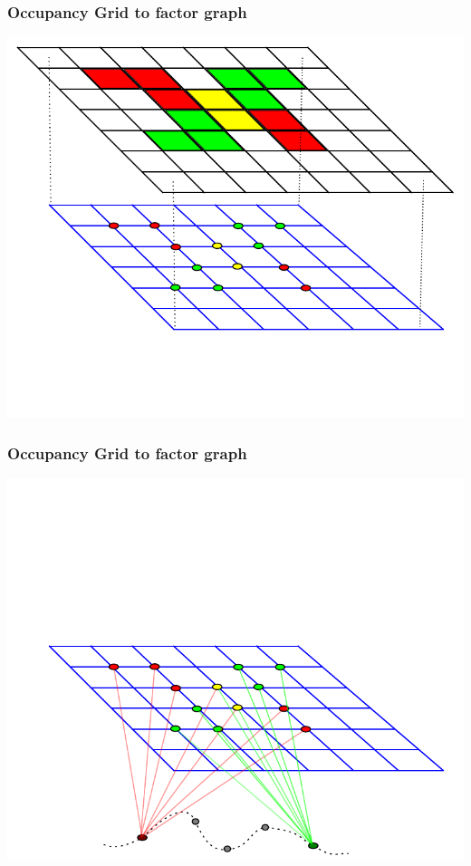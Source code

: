 \documentclass{beamer}
\begin{document}
\begin{frame}
\frametitle{Occupancy Grid to factor graph}
\includegraphics[width=\textwidth]{figures/factorgraph/fg2.pdf}
\end{frame}

\begin{frame}
\frametitle{Occupancy Grid to factor graph}
\includegraphics[trim=0in 0in 0in 2in, width=\textwidth]{figures/factorgraph/fg3.pdf}
\end{frame}
\end{document}
